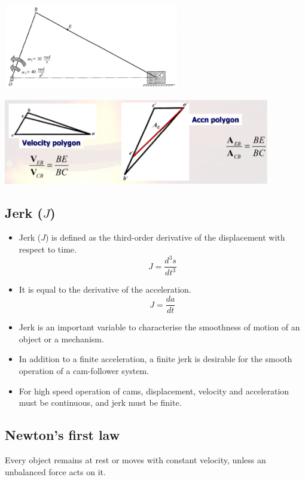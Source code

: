 \documentclass[11pt]{article}
\begin{document}
\begin{center}
\includegraphics[height=10em]{./images/acceleration-image-of-collinear-points-mechanism.png}
\end{center}
\begin{center}
\includegraphics[height=10em]{./images/acceleration-image-of-collinear-points-polygon.png}
\end{center}
\subsection{Jerk (\(J\))}
\label{sec:org77c4744}
\begin{itemize}
\item Jerk (\(J\)) is defined as the third-order derivative of the displacement with respect to time.
\[J = \frac{d^3 s}{dt^3}\]
\item It is equal to the derivative of the acceleration.
\[J = \frac{da}{dt}\]
\item Jerk is an important variable to characterise the smoothness of motion of an object or a mechanism.
\item In addition to a finite acceleration, a finite jerk is desirable for the smooth operation of a cam-follower system.
\item For high speed operation of cams, displacement, velocity and acceleration must be continuous, and jerk must be finite.
\end{itemize}
\subsection{Newton's first law}
\label{sec:orgb8e98ac}
Every object remains at rest or moves with constant velocity, unless an unbalanced force acts on it.
\end{document}
